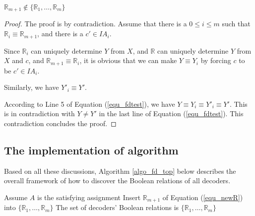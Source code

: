 \documentclass[journal]{IEEEtran}
\begin{document}
\begin{theorem}\label{thm_new1}
$\mathbb{R}_{m+1}\notin \{\mathbb{R}_1,\dots,\mathbb{R}_m\}$
\end{theorem}
\begin{proof}
The proof is by contradiction.
Assume that there is a $0\le i\le m$ such that $\mathbb{R}_i\equiv \mathbb{R}_{m+1}$,
and there is a $c'\in IA_i$.

Since $\mathbb{R}_i$ can uniquely determine $Y$ from $X$,
and $\mathbb{R}$ can uniquely determine $Y$ from $X$ and $c$,
and  $\mathbb{R}_{m+1}\equiv \mathbb{R}_i$,
it is obvious that we can make $Y\equiv Y_i$ by forcing $c$ to be $c'\in IA_i$.

Similarly,
we have $Y'_i\equiv Y'$.

According to Line 5 of Equation (\ref{equ_fdtest}),
we have $Y\equiv Y_i\equiv Y'_i\equiv Y'$.
This is in contradiction with $Y\ne Y'$ in the last line of Equation (\ref{equ_fdtest}).
This contradiction concludes the proof.
\end{proof}


%

\subsection{The implementation of algorithm}\label{subsec_fd_top}

Based on all these discussions,
Algorithm \ref{algo_fd_top} below describes the overall framework of how to discover the Boolean relations of all decoders.

\begin{algorithm}
\caption{$DiscoveringDecoders$}
\label{algo_fd_top}
\begin{algorithmic}[1]
\label{algo_fd_top_fdtest}
\STATE Assume $A$ is the satisfying assignment
\STATE Insert $\mathbb{R}_{m+1}$ of Equation (\ref{equ_newR}) into $\{\mathbb{R}_1,\dots,\mathbb{R}_m\}$
\label{algo_fd_top_newrel}
\ENDWHILE
\STATE The set of decoders' Boolean relations is $\{\mathbb{R}_1,\dots,\mathbb{R}_m\}$
\end{algorithmic}
\end{algorithm}
\end{document}
